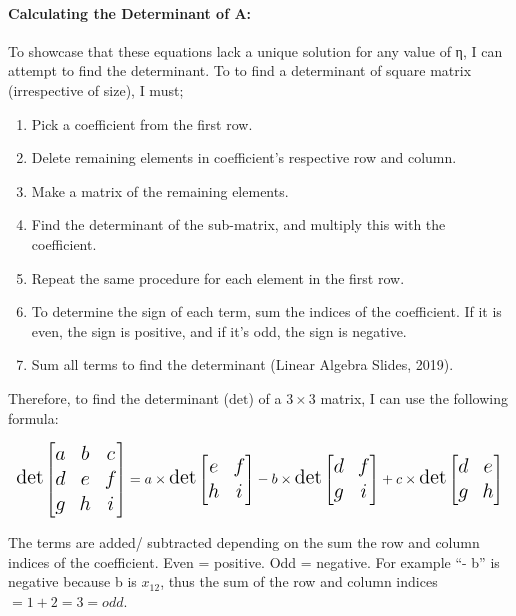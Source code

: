 \documentclass[
]{article}
\providecommand{\tightlist}{%
  \setlength{\itemsep}{0pt}\setlength{\parskip}{0pt}}
\begin{document}
\paragraph{Calculating the Determinant of
A:}\label{calculating-the-determinant-of-a}

To showcase that these equations lack a unique solution for any value of
η, I can attempt to find the determinant. To to find a determinant of
square matrix (irrespective of size), I must;

\begin{enumerate}
\def\labelenumi{\arabic{enumi}.}
\tightlist
\item
  Pick a coefficient from the first row.
\item
  Delete remaining elements in coefficient's respective row and column.
\item
  Make a matrix of the remaining elements.
\item
  Find the determinant of the sub-matrix, and multiply this with the
  coefficient.
\item
  Repeat the same procedure for each element in the first row.
\item
  To determine the sign of each term, sum the indices of the
  coefficient. If it is even, the sign is positive, and if it's odd, the
  sign is negative.
\item
  Sum all terms to find the determinant (Linear Algebra Slides, 2019).
\end{enumerate}

Therefore, to find the determinant (\(\text{det}\)) of a \(3 \times 3\)
matrix, I can use the following formula:

\[
\Large
\text{det} \begin{bmatrix} a & b & c \\ d & e & f \\ g & h & i \end{bmatrix} = a \times \text{det} \begin{bmatrix} e & f \\ h & i \end{bmatrix} - b \times \text{det} \begin{bmatrix} d & f \\ g & i \end{bmatrix} + c \times \text{det} \begin{bmatrix} d & e \\ g & h \end{bmatrix}
\]

The terms are added/ subtracted depending on the sum the row and column
indices of the coefficient. Even = positive. Odd = negative. For example
``- b'' is negative because b is \(x_{12}\), thus the sum of the row and
column indices \(= 1+2 = 3 = odd\).
\end{document}
